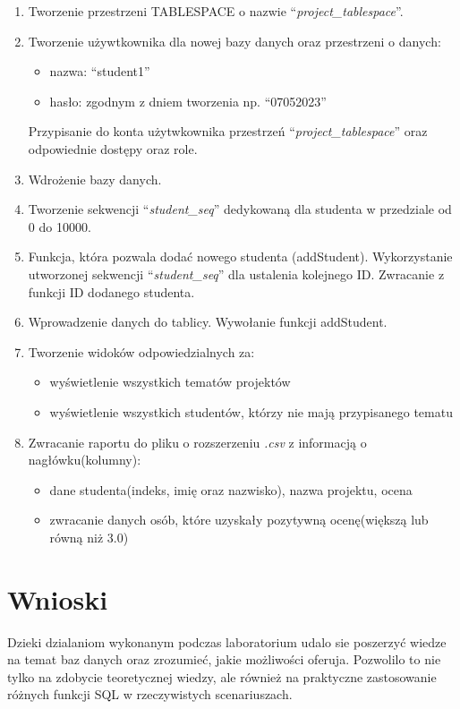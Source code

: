 \documentclass[a4paper, 10pt]{article}
\begin{document}
\begin{enumerate}
	\item Tworzenie przestrzeni TABLESPACE o nazwie ``\emph{project\_tablespace}''.
	\item Tworzenie używtkownika dla nowej bazy danych oraz przestrzeni o danych:
		\begin{itemize}
			\item nazwa: ``student1''
			\item hasło: zgodnym z dniem tworzenia np. ``07052023''
		\end{itemize}
		Przypisanie do konta użytwkownika przestrzeń ``\emph{project\_tablespace}'' oraz odpowiednie dostępy oraz role.
	\item Wdrożenie bazy danych. 
	\item Tworzenie sekwencji ``\emph{student\_seq}'' dedykowaną dla studenta w przedziale od 0 do 10000.
	\item Funkcja, która pozwala dodać nowego studenta (addStudent). Wykorzystanie utworzonej sekwencji ``\emph{student\_seq}'' dla ustalenia kolejnego ID. Zwracanie z funkcji ID dodanego studenta.
	\item Wprowadzenie danych do tablicy. Wywołanie funkcji addStudent.
	\item Tworzenie widoków odpowiedzialnych za:
		\begin{itemize}
			\item wyświetlenie wszystkich tematów projektów 
			\item wyświetlenie wszystkich studentów, którzy nie mają przypisanego tematu
		\end{itemize}
	\item Zwracanie raportu do pliku o rozszerzeniu \emph{.csv} z informacją o nagłówku(kolumny):
		\begin{itemize}
			\item dane studenta(indeks, imię oraz nazwisko), nazwa projektu, ocena
			\item zwracanie danych osób, które uzyskały pozytywną ocenę(większą lub równą niż 3.0)
		\end{itemize}
\end{enumerate}

\section{Wnioski}

Dzieki dzialaniom wykonanym podczas laboratorium udalo sie poszerzyć wiedze na temat baz danych oraz zrozumieć, jakie możliwości oferuja. Pozwolilo to nie tylko na zdobycie teoretycznej wiedzy, ale również na praktyczne zastosowanie różnych funkcji SQL w rzeczywistych scenariuszach.
\end{document}
